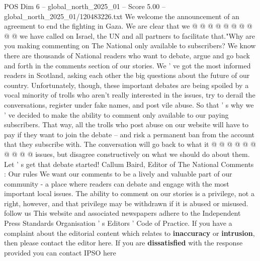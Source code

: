 \begin{textsample}{POS Dim 6 – global\_north\_2025\_01 – Score 5.00 – global\_north\_2025\_01/120483226.txt}
We welcome the announcement of an agreement to end the fighting in Gaza.
We are clear that we @ @ @ @ @ @ @ @ @ @ we have called on Israel, the UN and all partners to facilitate that."Why are you making commenting on The National only available to subscribers?
We know there are thousands of National readers who want to debate, argue and go back and forth in the comments section of our stories.
We ' ve got the most informed readers in Scotland, asking each other the big questions about the future of our country.
Unfortunately, though, these important debates are being spoiled by a vocal minority of trolls who aren't really interested in the issues, try to derail the conversations, register under fake names, and post vile abuse.
So that ' s why we ' ve decided to make the ability to comment only available to our paying subscribers.
That way, all the trolls who post abuse on our website will have to pay if they want to join the debate -- and risk a permanent ban from the account that they subscribe with.
The conversation will go back to what it @ @ @ @ @ @ @ @ @ @ issues, but disagree constructively on what we should do about them.
Let ' s get that debate started!
Callum Baird, Editor of The National Comments : Our rules We want our comments to be a lively and valuable part of our community - a place where readers can debate and engage with the most important local issues.
The ability to comment on our stories is a privilege, not a right, however, and that privilege may be withdrawn if it is abused or misused. follow us This website and associated newspapers adhere to the Independent Press Standards Organisation ' s Editors ' Code of Practice.
If you have a complaint about the editorial content which relates to \textbf{inaccuracy} or \textbf{intrusion}, then please contact the editor here.
If you are \textbf{dissatisfied} with the response provided you can contact IPSO here

\end{textsample}
